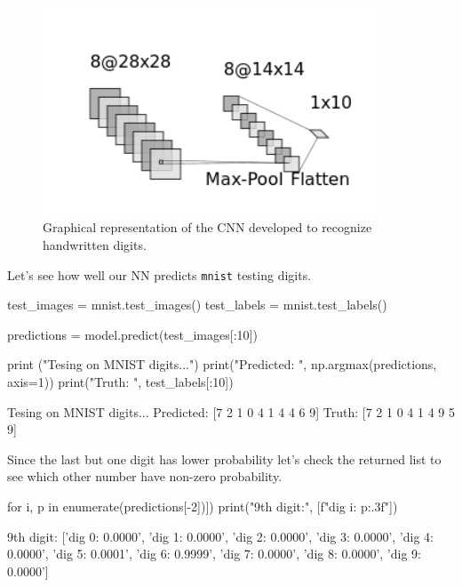\begin{figure}[hb]
\centering
\includegraphics[width=0.9\textwidth]{figures/cnn_2d}
\caption{Graphical representation of the CNN developed to recognize handwritten digits.}
\label{fig:cnn2d}
\end{figure}

Let's see how well our NN predicts \texttt{mnist} testing digits.

\begin{ipython}
test_images = mnist.test_images()
test_labels = mnist.test_labels()

predictions = model.predict(test_images[:10])

print ("Tesing on MNIST digits...")
print("Predicted: ", np.argmax(predictions, axis=1)) 
print("Truth:     ", test_labels[:10])
\end{ipython}
\begin{ioutput}
Tesing on MNIST digits...
Predicted:  [7 2 1 0 4 1 4 4 6 9]
Truth: [7 2 1 0 4 1 4 9 5 9]
\end{ioutput}

Since the last but one digit has lower probability let's check the returned list to see which other number have non-zero probability.

\begin{ipython}
for i, p in enumerate(predictions[-2])])
    print("9th digit:", [f"dig {i}: {p:.3f}"])
\end{ipython}
\begin{ioutput}
9th digit: ['dig 0: 0.0000', 'dig 1: 0.0000', 'dig 2: 0.0000', 'dig 3: 0.0000', 
            'dig 4: 0.0000', 'dig 5: 0.0001', 'dig 6: 0.9999', 'dig 7: 0.0000', 
            'dig 8: 0.0000', 'dig 9: 0.0000']
\end{ioutput}


